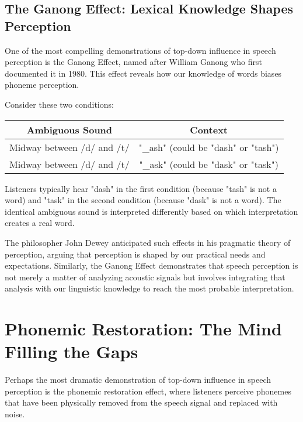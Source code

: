 \documentclass[12pt,a4paper]{article}
\begin{document}
\subsection{The Ganong Effect: Lexical Knowledge Shapes Perception}

One of the most compelling demonstrations of top-down influence in speech perception is the Ganong Effect, named after William Ganong who first documented it in 1980. This effect reveals how our knowledge of words biases phoneme perception.

\begin{tcolorbox}[enhanced, colback=yellow!5, colframe=yellow!75!black, title=The Ganong Effect Demonstrated]

Consider these two conditions:

\begin{center}
\begin{tabular}{|c|c|}
\hline
\textbf{Ambiguous Sound} & \textbf{Context} \\
\hline
Midway between /d/ and /t/ & "\_ash" (could be "dash" or "tash") \\
\hline
Midway between /d/ and /t/ & "\_ask" (could be "dask" or "task") \\
\hline
\end{tabular}
\end{center}

Listeners typically hear "dash" in the first condition (because "tash" is not a word) and "task" in the second condition (because "dask" is not a word). The identical ambiguous sound is interpreted differently based on which interpretation creates a real word.
\end{tcolorbox}

The philosopher John Dewey anticipated such effects in his pragmatic theory of perception, arguing that perception is shaped by our practical needs and expectations. Similarly, the Ganong Effect demonstrates that speech perception is not merely a matter of analyzing acoustic signals but involves integrating that analysis with our linguistic knowledge to reach the most probable interpretation.

\section{Phonemic Restoration: The Mind Filling the Gaps}

Perhaps the most dramatic demonstration of top-down influence in speech perception is the phonemic restoration effect, where listeners perceive phonemes that have been physically removed from the speech signal and replaced with noise.
\end{document}

